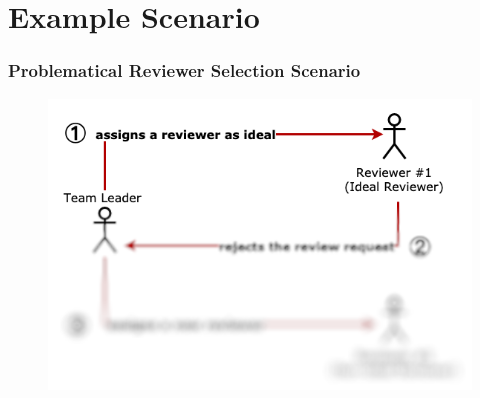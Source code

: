 \documentclass{beamer}
\begin{document}
\section{Example Scenario}
\begin{frame}
\frametitle{\large Problematical Reviewer Selection Scenario}
  \begin{figure}
    \includegraphics[height=0.8\textheight]{img/to_blur1.png}
    \end{figure}

\end{frame}
\end{document}
